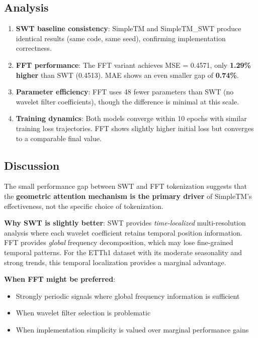 \documentclass[12pt,a4paper]{article}
\begin{document}
\subsection{Analysis}

\begin{enumerate}
  \item \textbf{SWT baseline consistency}: SimpleTM and SimpleTM\_SWT produce identical results (same code, same seed), confirming implementation correctness.

  \item \textbf{FFT performance}: The FFT variant achieves MSE = 0.4571, only \textbf{1.29\% higher} than SWT (0.4513). MAE shows an even smaller gap of \textbf{0.74\%}.

  \item \textbf{Parameter efficiency}: FFT uses 48 fewer parameters than SWT (no wavelet filter coefficients), though the difference is minimal at this scale.

  \item \textbf{Training dynamics}: Both models converge within 10 epochs with similar training loss trajectories. FFT shows slightly higher initial loss but converges to a comparable final value.
\end{enumerate}

\subsection{Discussion}

The small performance gap between SWT and FFT tokenization suggests that the \textbf{geometric attention mechanism is the primary driver} of SimpleTM's effectiveness, not the specific choice of tokenization.

\textbf{Why SWT is slightly better}: SWT provides \textit{time-localized} multi-resolution analysis where each wavelet coefficient retains temporal position information. FFT provides \textit{global} frequency decomposition, which may lose fine-grained temporal patterns. For the ETTh1 dataset with its moderate seasonality and strong trends, this temporal localization provides a marginal advantage.

\textbf{When FFT might be preferred}:
\begin{itemize}[noitemsep]
  \item Strongly periodic signals where global frequency information is sufficient
  \item When wavelet filter selection is problematic
  \item When implementation simplicity is valued over marginal performance gains
\end{itemize}
\end{document}
